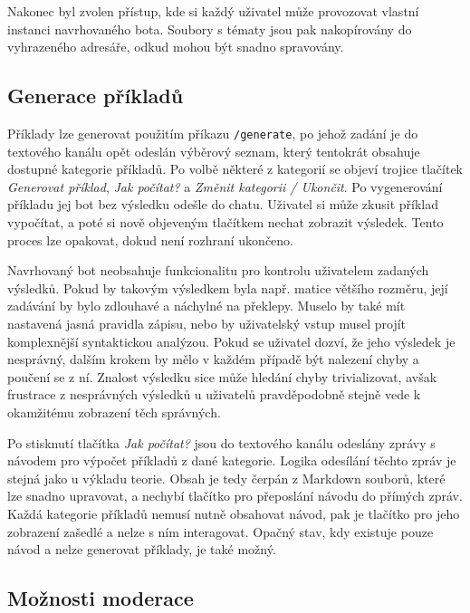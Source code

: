 \documentclass[FM]{tulthesis}
\begin{document}
	Nakonec byl zvolen přístup, kde si každý uživatel může provozovat vlastní instanci navrhovaného bota. Soubory s tématy jsou pak nakopírovány do vyhrazeného adresáře, odkud mohou být snadno spravovány. %
	
	\subsection{Generace příkladů} %
	
	Příklady lze generovat použitím příkazu \verb|/generate|, po jehož zadání je do textového kanálu opět odeslán výběrový seznam, který tentokrát obsahuje dostupné kategorie příkladů. Po volbě některé z kategorií se objeví trojice tlačítek \textit{Generovat příklad}, \textit{Jak počítat?} a \textit{Změnit kategorii / Ukončit}. Po vygenerování příkladu jej bot bez výsledku odešle do chatu. Uživatel si může zkusit příklad vypočítat, a poté si nově objeveným tlačítkem nechat zobrazit výsledek. Tento proces lze opakovat, dokud není rozhraní ukončeno.
	
	Navrhovaný bot neobsahuje funkcionalitu pro kontrolu uživatelem zadaných výsledků. Pokud by takovým výsledkem byla např. matice většího rozměru, její zadávání by bylo zdlouhavé a náchylné na překlepy. Muselo by také mít nastavená jasná pravidla zápisu, nebo by uživatelský vstup musel projít komplexnější syntaktickou analýzou. Pokud se uživatel dozví, že jeho výsledek je nesprávný, dalším krokem by mělo v každém případě být nalezení chyby a poučení se z ní. Znalost výsledku sice může hledání chyby trivializovat, avšak frustrace z nesprávných výsledků u uživatelů pravděpodobně stejně vede k okamžitému zobrazení těch správných.
	
	Po stisknutí tlačítka \textit{Jak počítat?} jsou do textového kanálu odeslány zprávy s návodem pro výpočet příkladů z dané kategorie. Logika odesílání těchto zpráv je stejná jako u výkladu teorie. Obsah je tedy čerpán z Markdown souborů, které lze snadno upravovat, a nechybí tlačítko pro přeposlání návodu do přímých zpráv. Každá kategorie příkladů nemusí nutně obsahovat návod, pak je tlačítko pro jeho zobrazení zašedlé a nelze s ním interagovat. Opačný stav, kdy existuje pouze návod a nelze generovat příklady, je také možný. %
		
	\subsection{Možnosti moderace}
	
\end{document}
